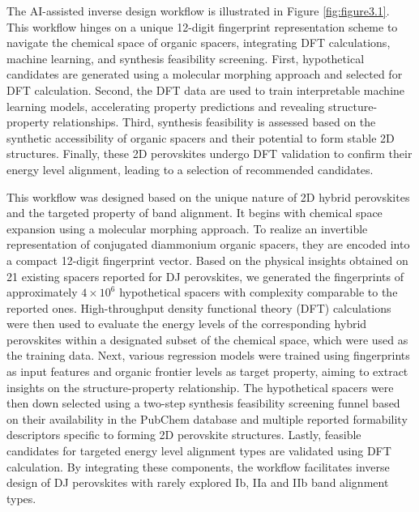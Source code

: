 The AI-assisted inverse design workflow is illustrated in Figure \ref{fig:figure3.1}. This workflow hinges on a unique 12-digit fingerprint representation scheme to navigate the chemical space of organic spacers, integrating DFT calculations, machine learning, and synthesis feasibility screening. First, hypothetical candidates are generated using a molecular morphing approach and selected for DFT calculation. Second, the DFT data are used to train interpretable machine learning models, accelerating property predictions and revealing structure-property relationships. Third, synthesis feasibility is assessed based on the synthetic accessibility of organic spacers and their potential to form stable 2D structures. Finally, these 2D perovskites undergo DFT validation to confirm their energy level alignment, leading to a selection of recommended candidates.

This workflow was designed based on the unique nature of 2D hybrid perovskites and the targeted property of band alignment. It begins with chemical space expansion using a molecular morphing approach. To realize an invertible representation of conjugated diammonium organic spacers, they are encoded into a compact 12-digit fingerprint vector. Based on the physical insights obtained on 21 existing spacers reported for DJ perovskites, we generated the fingerprints of approximately $4\times10^6$ hypothetical spacers with complexity comparable to the reported ones. High-throughput density functional theory (DFT) calculations were then used to evaluate the energy levels of the corresponding hybrid perovskites within a designated subset of the chemical space, which were used as the training data. Next, various regression models were trained using fingerprints as input features and organic frontier levels as target property, aiming to extract insights on the structure-property relationship. The hypothetical spacers were then down selected using a two-step synthesis feasibility screening funnel based on their availability in the PubChem database and multiple reported formability descriptors specific to forming 2D perovskite structures. Lastly, feasible candidates for targeted energy level alignment types are validated using DFT calculation. By integrating these components, the workflow facilitates inverse design of DJ perovskites with rarely explored Ib, IIa and IIb band alignment types. 

